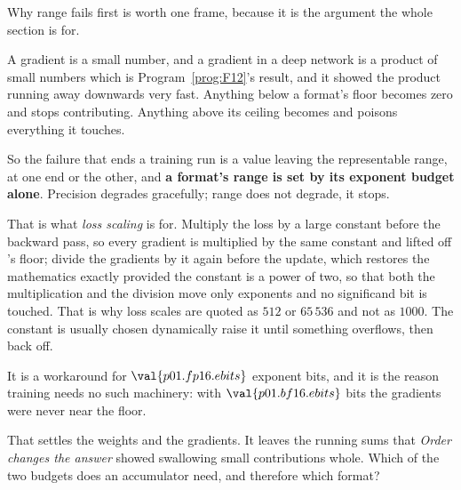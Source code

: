 \begin{fr}
Why range fails first is worth one frame, because it is the argument the whole
section is for.

A gradient is a small number, and a gradient in a deep network is a product of
small numbers \dash{} which is Program~\ref{prog:F12}'s result, and it showed
the product running away downwards very fast. Anything below a format's floor
becomes zero and stops contributing. Anything above its ceiling becomes
 and poisons everything it touches.

So the failure that ends a training run is a value leaving the representable
range, at one end or the other, and \textbf{a format's range is set by its
exponent budget alone}. Precision degrades gracefully; range does not degrade,
it stops.

\begin{aibox}
That is what \emph{loss scaling} is for. Multiply the loss by a large constant
before the backward pass, so every gradient is multiplied by the same constant
and lifted off 's floor; divide the gradients by it again before the
update, which restores the mathematics exactly \dash{} provided the
constant is a power of two, so that both the multiplication and the division
move only exponents and no significand bit is touched. That is why loss scales
are quoted as $512$ or $65\,536$ and not as $1000$. The constant is usually
chosen dynamically \dash{} raise it until something overflows, then back off.

It is a workaround for $\val{p01.fp16.ebits}$ exponent bits, and it is the
reason  training needs no such machinery: with
$\val{p01.bf16.ebits}$ bits the gradients were never near the floor.
\end{aibox}

That settles the weights and the gradients. It leaves the running sums that
\emph{Order changes the answer} showed swallowing small contributions whole. Which of the two
budgets does an accumulator need, and therefore which format?
\dotline
\nextframe
\end{fr}

